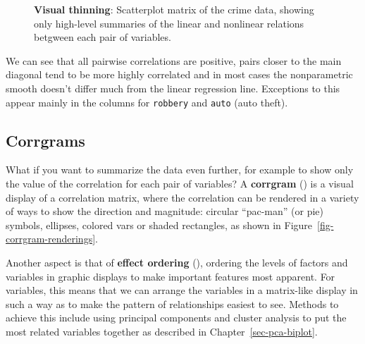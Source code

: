 \documentclass[
  letterpaper,
  10pt,
  krantz2]{krantz}
\begin{document}
{\begin{figure}[H]
{}

\caption{\label{fig-crime-spm}\textbf{Visual thinning}: Scatterplot
matrix of the crime data, showing only high-level summaries of the
linear and nonlinear relations betgween each pair of variables.}

\end{figure}%

We can see that all pairwise correlations are positive, pairs closer to
the main diagonal tend to be more highly correlated and in most cases
the nonparametric smooth doesn't differ much from the linear regression
line. Exceptions to this appear mainly in the columns for
\texttt{robbery} and \texttt{auto} (auto theft).

\subsection{Corrgrams}\label{sec-corrgram}

What if you want to summarize the data even further, for example to show
only the value of the correlation for each pair of variables? A
\textbf{corrgram} ()
is a visual display of a correlation matrix, where the correlation can
be rendered in a variety of ways to show the direction and magnitude:
circular ``pac-man'' (or pie) symbols, ellipses, colored vars or shaded
rectangles, as shown in Figure~\ref{fig-corrgram-renderings}.

Another aspect is that of \textbf{effect ordering}
(),
ordering the levels of factors and variables in graphic displays to make
important features most apparent. For variables, this means that we can
arrange the variables in a matrix-like display in such a way as to make
the pattern of relationships easiest to see. Methods to achieve this
include using principal components and cluster analysis to put the most
related variables together as described in Chapter~\ref{sec-pca-biplot}.

\begin{figure}

\end{figure}}
\end{document}
